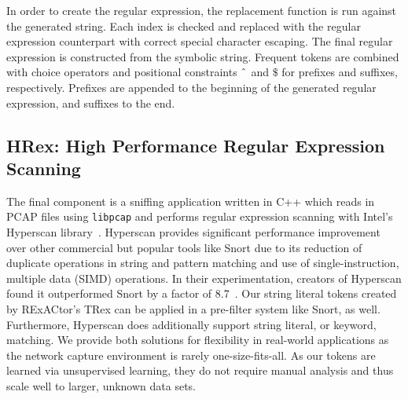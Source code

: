 In order to create the regular expression, the replacement function is run against the generated string. Each index is checked and replaced with the regular expression counterpart with correct special character escaping. The final regular expression is constructed from the symbolic string. Frequent tokens are combined with choice operators and positional constraints $\string^$ and $\$$ for prefixes and suffixes, respectively. Prefixes are appended to the beginning of the generated regular expression, and suffixes to the end.

\subsection{HRex: High Performance Regular Expression Scanning}
The final component is a sniffing application written in C++ which reads in PCAP files using \texttt{libpcap} and performs regular expression scanning with Intel's Hyperscan library~\cite{hyperscan}. Hyperscan provides significant performance improvement over other commercial but popular tools like Snort due to its reduction of duplicate operations in string and pattern matching and use of single-instruction, multiple data (SIMD) operations. In their experimentation, creators of Hyperscan found it outperformed Snort by a factor of 8.7~\cite{hyperscanusinex}. Our string literal tokens created by RExACtor's TRex can be applied in a pre-filter system like Snort, as well. Furthermore, Hyperscan does additionally support string literal, or keyword, matching. We provide both solutions for flexibility in real-world applications as the network capture environment is rarely one-size-fits-all. As our tokens are learned via unsupervised learning, they do not require manual analysis and thus scale well to larger, unknown data sets.

